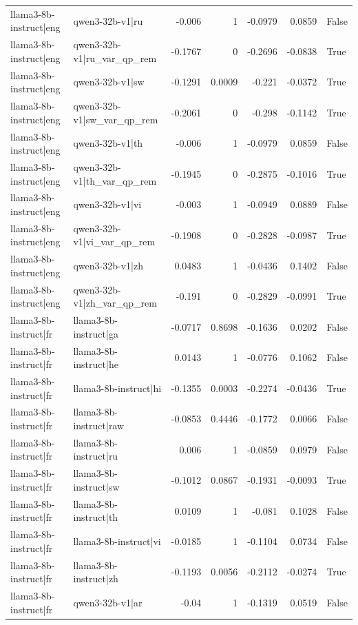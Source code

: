 \begin{table}
\begin{tabular}{l l r r r r l}
llama3-8b-instruct|eng & qwen3-32b-v1|ru & -0.006 & 1 & -0.0979 & 0.0859 & False \\
llama3-8b-instruct|eng & qwen3-32b-v1|ru_var_qp_rem & -0.1767 & 0 & -0.2696 & -0.0838 & True \\
llama3-8b-instruct|eng & qwen3-32b-v1|sw & -0.1291 & 0.0009 & -0.221 & -0.0372 & True \\
llama3-8b-instruct|eng & qwen3-32b-v1|sw_var_qp_rem & -0.2061 & 0 & -0.298 & -0.1142 & True \\
llama3-8b-instruct|eng & qwen3-32b-v1|th & -0.006 & 1 & -0.0979 & 0.0859 & False \\
llama3-8b-instruct|eng & qwen3-32b-v1|th_var_qp_rem & -0.1945 & 0 & -0.2875 & -0.1016 & True \\
llama3-8b-instruct|eng & qwen3-32b-v1|vi & -0.003 & 1 & -0.0949 & 0.0889 & False \\
llama3-8b-instruct|eng & qwen3-32b-v1|vi_var_qp_rem & -0.1908 & 0 & -0.2828 & -0.0987 & True \\
llama3-8b-instruct|eng & qwen3-32b-v1|zh & 0.0483 & 1 & -0.0436 & 0.1402 & False \\
llama3-8b-instruct|eng & qwen3-32b-v1|zh_var_qp_rem & -0.191 & 0 & -0.2829 & -0.0991 & True \\
llama3-8b-instruct|fr & llama3-8b-instruct|ga & -0.0717 & 0.8698 & -0.1636 & 0.0202 & False \\
llama3-8b-instruct|fr & llama3-8b-instruct|he & 0.0143 & 1 & -0.0776 & 0.1062 & False \\
llama3-8b-instruct|fr & llama3-8b-instruct|hi & -0.1355 & 0.0003 & -0.2274 & -0.0436 & True \\
llama3-8b-instruct|fr & llama3-8b-instruct|raw & -0.0853 & 0.4446 & -0.1772 & 0.0066 & False \\
llama3-8b-instruct|fr & llama3-8b-instruct|ru & 0.006 & 1 & -0.0859 & 0.0979 & False \\
llama3-8b-instruct|fr & llama3-8b-instruct|sw & -0.1012 & 0.0867 & -0.1931 & -0.0093 & True \\
llama3-8b-instruct|fr & llama3-8b-instruct|th & 0.0109 & 1 & -0.081 & 0.1028 & False \\
llama3-8b-instruct|fr & llama3-8b-instruct|vi & -0.0185 & 1 & -0.1104 & 0.0734 & False \\
llama3-8b-instruct|fr & llama3-8b-instruct|zh & -0.1193 & 0.0056 & -0.2112 & -0.0274 & True \\
llama3-8b-instruct|fr & qwen3-32b-v1|ar & -0.04 & 1 & -0.1319 & 0.0519 & False \\

\end{tabular}
\end{table}
